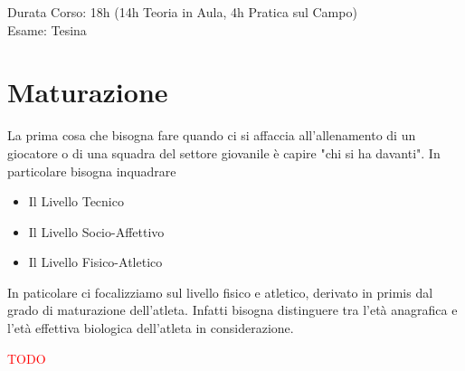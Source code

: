 \documentclass[../uefaC.tex]{subfiles}
\begin{document}
\onlyinsubfile{\maketitle}

\onlyinsubfile{}

\onlyinsubfile{\tableofcontents}


Durata Corso: 18h (14h Teoria in Aula, 4h Pratica sul Campo) \hfill \\
Esame: Tesina

\section{Maturazione}

La prima cosa che bisogna fare quando ci si affaccia all'allenamento di un giocatore o di una squadra del settore giovanile è capire "chi si ha davanti". In particolare bisogna inquadrare
\begin{itemize}
    \item{Il Livello Tecnico}
    \item{Il Livello Socio-Affettivo}
    \item{Il Livello Fisico-Atletico}
\end{itemize}

In paticolare ci focalizziamo sul livello fisico e atletico, derivato in primis dal grado di maturazione dell'atleta. Infatti bisogna distinguere tra l'età anagrafica e l'età effettiva biologica dell'atleta in considerazione.

\textcolor{red}{TODO}
\end{document}
